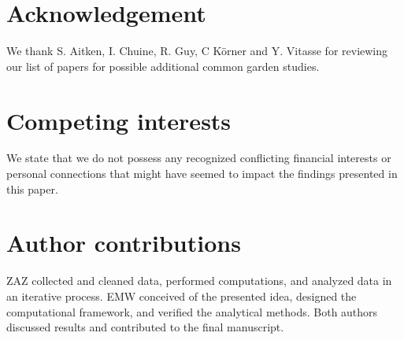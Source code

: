\documentclass[12pt]{article}
\begin{document}



 
\section{Acknowledgement}
We thank S. Aitken,  I. Chuine, R. Guy, C K\"{o}rner and Y. Vitasse for reviewing our list of papers for possible additional common garden studies. 

\section{Competing interests}
We state that we do not possess any recognized conflicting financial interests or personal connections that might have seemed to impact the findings presented in this paper.

\section{Author contributions}
ZAZ collected and cleaned data, performed computations, and analyzed data in an iterative process. EMW conceived of the presented idea, designed the computational framework, and verified the analytical methods. Both authors discussed results and contributed to the final manuscript. 
\end{document}
